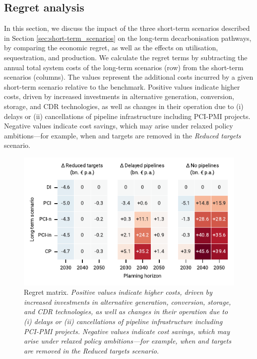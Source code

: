 \documentclass[preprint,12pt,sort&compress]{elsarticle}
\begin{document}
\subsection{Regret analysis}
\label{sec:regret_analysis}

In this section, we discuss the impact of the three short-term scenarios described in Section \ref{sec:short-term_scenarios} on the long-term decarbonisation pathways, by comparing the economic regret, as well as the effects on  utilisation, sequestration, and  production.
We calculate the regret terms by subtracting the annual total system costs of the long-term scenarios (row) from the short-term scenarios (columns). 
The values represent the additional costs incurred by a given short-term scenario relative to the benchmark. Positive values indicate higher costs, driven by increased investments in alternative generation, conversion, storage, and CDR technologies, as well as changes in their operation due to (i) delays or (ii) cancellations of pipeline infrastructure including PCI-PMI projects. Negative values indicate cost savings, which may arise under relaxed policy ambitions—for example, when  and  targets are removed in the \textit{Reduced targets} scenario.


\begin{figure}[t]
  \centering
  \includegraphics{regret_matrix}
  \caption{Regret matrix. \textit{Positive values indicate higher costs, driven by increased investments in alternative generation, conversion, storage, and CDR technologies, as well as changes in their operation due to (i) delays or (ii) cancellations of pipeline infrastructure including PCI-PMI projects. Negative values indicate cost savings, which may arise under relaxed policy ambitions—for example, when  and  targets are removed in the \textit{Reduced targets} scenario.}}
  \label{fig:regret_matrix_results}
\end{figure}
\end{document}

